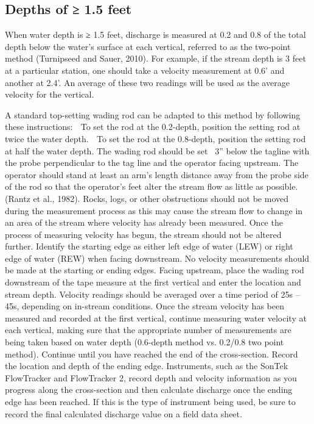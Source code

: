 \documentclass[12pt]{../SOP3_beta}\usepackage[]{graphicx}\usepackage[]{xcolor}
\begin{document}
\subsection{Depths of ≥ 1.5 feet}

When water depth is ≥ 1.5 feet, discharge is measured at 0.2 and 0.8 of the total depth
below the water’s surface at each vertical, referred to as the two-point method
(Turnipseed and Sauer, 2010). For example, if the stream depth is 3 feet at a particular
station, one should take a velocity measurement at 0.6’ and another at 2.4’. An average
of these two readings will be used as the average velocity for the vertical.

A standard top-setting wading rod can be adapted to this method by following these
instructions:
 To set the rod at the 0.2-depth, position the setting rod at twice the water
depth.
 To set the rod at the 0.8-depth, position the setting rod at half the water depth.
The wading rod should be set ~3” below the tagline with the probe perpendicular to the
tag line and the operator facing upstream. The operator should stand at least an arm’s
length distance away from the probe side of the rod so that the operator’s feet alter the
stream flow as little as possible. (Rantz et al., 1982). Rocks, logs, or other obstructions
should not be moved during the measurement process as this may cause the stream
flow to change in an area of the stream where velocity has already been measured.
Once the process of measuring velocity has begun, the stream should not be altered
further.
Identify the starting edge as either left edge of water (LEW) or right edge of water (REW)
when facing downstream. No velocity measurements should be made at the starting or
ending edges. Facing upstream, place the wading rod downstream of the tape measure
at the first vertical and enter the location and stream depth. Velocity readings should
be averaged over a time period of 25s – 45s, depending on in-stream conditions.
Once the stream velocity has been measured and recorded at the first vertical, continue
measuring water velocity at each vertical, making sure that the appropriate number of
measurements are being taken based on water depth (0.6-depth method vs. 0.2/0.8
two point method). Continue until you have reached the end of the cross-section.
Record the location and depth of the ending edge.
Instruments, such as the SonTek FlowTracker and FlowTracker 2, record depth and
velocity information as you progress along the cross-section and then calculate
discharge once the ending edge has been reached. If this is the type of instrument
being used, be sure to record the final calculated discharge value on a field data sheet.
\end{document}
